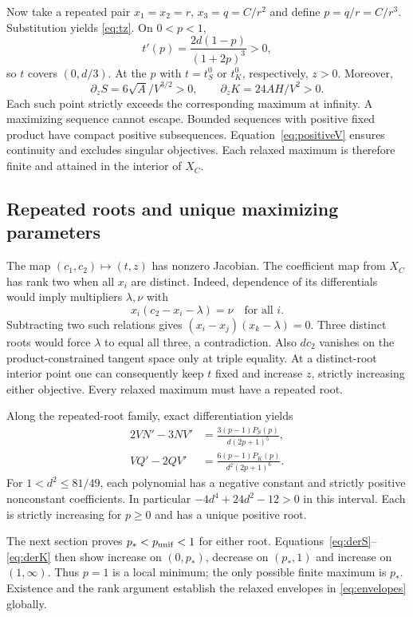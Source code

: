 \documentclass[11pt,a4paper]{article}
\begin{document}
Now take a repeated pair $x_1=x_2=r$, $x_3=q=C/r^2$ and define $p=q/r=C/r^3$. Substitution yields \eqref{eq:tz}. On $0<p<1$,
\begin{equation}
 t'(p)=\frac{2d(1-p)}{(1+2p)^3}>0,
\end{equation}
so $t$ covers $(0,d/3)$. At the $p$ with $t=t_S^0$ or $t_K^0$, respectively, $z>0$. Moreover,
\begin{equation}
 \partial_z S=6\sqrt A/V^{3/2}>0,\qquad \partial_z K=24AH/V^2>0.
\end{equation}
Each such point strictly exceeds the corresponding maximum at infinity. A maximizing sequence cannot escape. Bounded sequences with positive fixed product have compact positive subsequences. Equation~\eqref{eq:positiveV} ensures continuity and excludes singular objectives. Each relaxed maximum is therefore finite and attained in the interior of $X_C$.

\subsection{Repeated roots and unique maximizing parameters}
The map $(c_1,c_2)\mapsto(t,z)$ has nonzero Jacobian. The coefficient map from $X_C$ has rank two when all $x_i$ are distinct. Indeed, dependence of its differentials would imply multipliers $\lambda,\nu$ with
\begin{equation}
 x_i(c_2-x_i-\lambda)=\nu\quad\text{for all }i.
\end{equation}
Subtracting two such relations gives $(x_i-x_j)(x_k-\lambda)=0$. Three distinct roots would force $\lambda$ to equal all three, a contradiction. Also $dc_2$ vanishes on the product-constrained tangent space only at triple equality. At a distinct-root interior point one can consequently keep $t$ fixed and increase $z$, strictly increasing either objective. Every relaxed maximum must have a repeated root.

Along the repeated-root family, exact differentiation yields
\begin{align}
 2VN'-3NV'&=\frac{3(p-1)P_S(p)}{d(2p+1)^5},\label{eq:derS}\\
 VQ'-2QV'&=\frac{6(p-1)P_K(p)}{d^2(2p+1)^6}.\label{eq:derK}
\end{align}
For $1<d^2\leq81/49$, each polynomial has a negative constant and strictly positive nonconstant coefficients. In particular $-4d^4+24d^2-12>0$ in this interval. Each is strictly increasing for $p\geq0$ and has a unique positive root.

The next section proves $p_*<p_{\rm unif}<1$ for either root. Equations~\eqref{eq:derS}--\eqref{eq:derK} then show increase on $(0,p_*)$, decrease on $(p_*,1)$ and increase on $(1,\infty)$. Thus $p=1$ is a local minimum; the only possible finite maximum is $p_*$. Existence and the rank argument establish the relaxed envelopes in \eqref{eq:envelopes} globally.
\end{document}
